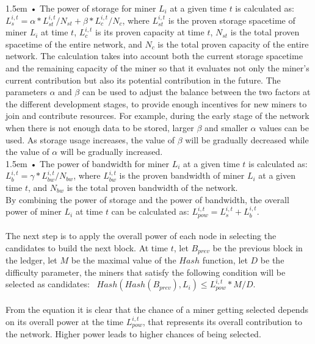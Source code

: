 \documentclass[10pt,a4paper]{article}
\begin{document}
\hangindent 1.5em
\noindent   
• The power of storage for miner $L_{i}$ at a given time $t$ is calculated as: $L^{i,t}_{s} = \alpha * L^{i,t}_{st} / N_{st} + \beta * L^{i,t}_{c} / N_{c}$, where $L^{i,t}_{st}$ is the proven storage spacetime of miner $L_{i}$ at time $t$,  $L^{i,t}_{c}$ is its proven capacity at time $t$,  $N_{st}$ is the total proven spacetime of the entire network, and $N_{c}$ is the total proven capacity of the entire network. The calculation takes into account both the current storage spacetime and the remaining capacity of the miner so that it evaluates not only the miner’s current contribution but also its potential contribution in the future. The parameters $\alpha$ and $\beta$ can be used to adjust the balance between the two factors at the different development stages, to provide enough incentives for new miners to join and contribute resources. For example, during the early stage of the network when there is not enough data to be stored, larger $\beta$ and smaller $\alpha$ values can be used. As storage usage increases, the value of $\beta$ will be gradually decreased while the value of $\alpha$ will be gradually increased.
\vspace{-0.8em}
\\

\hangindent 1.5em
\noindent   
• The power of bandwidth for miner $L_{i}$ at a given time $t$ is calculated as: $L^{i,t}_{b} = \gamma * L^{i,t}_{bw} / N_{bw}$, where $L^{i,t}_{bw}$ is the proven bandwidth of miner $L_{i}$ at a given time $t$, and $N_{bw}$ is the total proven bandwidth of the network.
\vspace{-0.8em}
\\

\noindent 
By combining the power of storage and the power of bandwidth, the overall power of miner $L_{i}$ at time $t$ can be calculated as: $L^{i,t}_{pow} = L^{i,t}_{s} + L^{i,t}_{b}$.
\vspace{-0.5em}
 \\ \\The next step is to apply the overall power of each node in selecting the candidates to build the next block. At time $t$, let $B_{prev}$ be the previous block in the ledger, let $M$ be the maximal value of the $Hash$ function, let $D$ be the difficulty parameter, the miners that satisfy the following condition will be selected as candidates:  $Hash(Hash(B_{prev}), L_{i}) \leq L^{i,t}_{pow}*M/D$.
 \vspace{-0.5em}
\\ \\From the equation it is clear that the chance of a miner getting selected depends on its overall power at the time $L^{i,t}_{pow}$, that represents its overall contribution to the network. Higher power leads to higher chances of being selected. 
\vspace{-0.5em}
\end{document}
